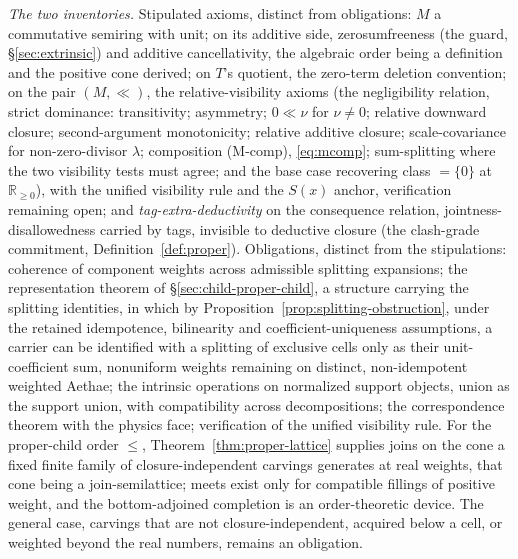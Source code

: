 \textit{The two inventories.}  Stipulated axioms, distinct from obligations: $M$ a commutative semiring with unit; on its additive side, zerosumfreeness (the guard, §\ref{sec:extrinsic}) and additive cancellativity, the algebraic order being a definition and the positive cone derived; on $T$'s quotient, the zero-term deletion convention; on the pair $(M, \ll)$, the relative-visibility axioms (the negligibility relation, strict dominance: transitivity; asymmetry; $0 \ll \nu$ for $\nu \neq 0$; relative downward closure; second-argument monotonicity; relative additive closure; scale-covariance for non-zero-divisor $\lambda$; composition (M-comp), \eqref{eq:mcomp}; sum-splitting where the two visibility tests must agree; and the base case recovering class $= \{0\}$ at $\mathbb{R}_{\geq 0}$), with the unified visibility rule and the $S(x)$ anchor, verification remaining open; and \emph{tag-extra-deductivity} on the consequence relation, jointness-disallowedness carried by tags, invisible to deductive closure (the clash-grade commitment, Definition~\ref{def:proper}). Obligations, distinct from the stipulations: coherence of component weights across admissible splitting expansions; the representation theorem of \S\ref{sec:child-proper-child}, a structure carrying the splitting identities, in which by Proposition~\ref{prop:splitting-obstruction}, under the retained idempotence, bilinearity and coefficient-uniqueness assumptions, a carrier can be identified with a splitting of exclusive cells only as their unit-coefficient sum, nonuniform weights remaining on distinct, non-idempotent weighted Aethae; the intrinsic operations on normalized support objects, union as the support union, with compatibility across decompositions; the correspondence theorem with the physics face; verification of the unified visibility rule. For the proper-child order $\le$, Theorem~\ref{thm:proper-lattice} supplies joins on the cone a fixed finite family of closure-independent carvings generates at real weights, that cone being a join-semilattice; meets exist only for compatible fillings of positive weight, and the bottom-adjoined completion is an order-theoretic device. The general case, carvings that are not closure-independent, acquired below a cell, or weighted beyond the real numbers, remains an obligation.
